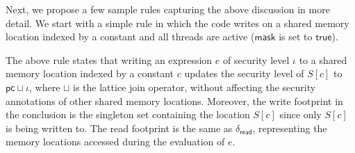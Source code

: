 %
Next, we propose a few sample rules capturing the above discussion in more detail. 
%
We start with a simple rule in which the code writes on a shared memory location indexed by a constant and all threads are active ($\mathsf{mask}$ is set to $\mathsf{true}$).
%
{\small\begin{mathpar}
    \end{mathpar}}
The above rule states that writing an expression $e$ of security level $\iota$ to a shared memory location indexed by a constant $c$ updates the security level of $S[c]$ to $\mathsf{pc} \sqcup \iota$, where $\sqcup$ is the lattice join operator, without affecting the security annotations of other shared memory locations.
% 
Moreover, the write footprint in the conclusion is the singleton set containing the location $S[c]$ since only $S[c]$ is being written to. The read footprint is the same as $\delta_{\mathsf{read}}$, representing the memory locations accessed during the evaluation of $e$. 


